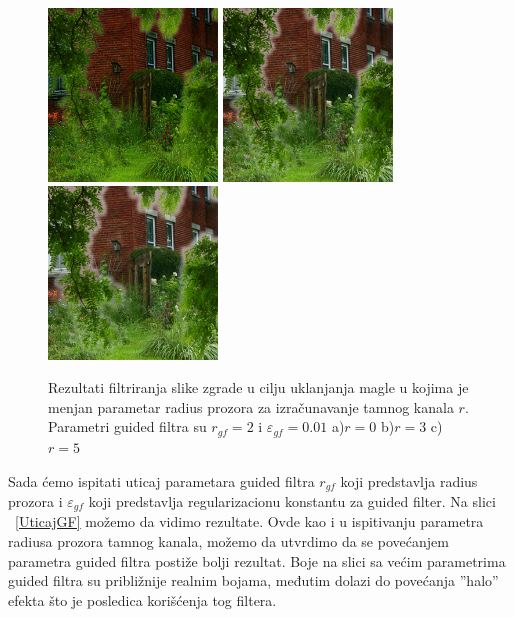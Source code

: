 \documentclass[a4paper,12pt,titlepage]{article}
\begin{document}
\begin{figure}[ht!]
\centering
\includegraphics[width=45mm]{img/hazeResDC0.png}
\includegraphics[width=45mm]{img/hazeResDC3.png}
\includegraphics[width=45mm]{img/hazeResDC5.png}
\caption{Rezultati filtriranja slike zgrade u cilju uklanjanja magle u kojima je menjan parametar radius prozora za izračunavanje tamnog kanala $r$. Parametri guided filtra su $r_{gf} = 2$ i  $\varepsilon_{gf} = 0.01$ a)$r = 0$ b)$r = 3$ c)$r = 5$}
\label{UticajRdc}
\end{figure}  

Sada ćemo ispitati uticaj parametara guided filtra $r_{gf}$ koji predstavlja radius prozora i $\varepsilon_{gf}$ koji predstavlja  regularizacionu konstantu za guided filter. Na slici ~\ref{UticajGF} možemo da vidimo rezultate. Ovde kao i u ispitivanju parametra radiusa prozora tamnog kanala, možemo da utvrdimo da se povećanjem parametra guided filtra postiže bolji rezultat. Boje na slici sa većim parametrima guided filtra su približnije realnim bojama, međutim dolazi do povećanja ''halo'' efekta što je posledica korišćenja tog filtera. 
\end{document}
